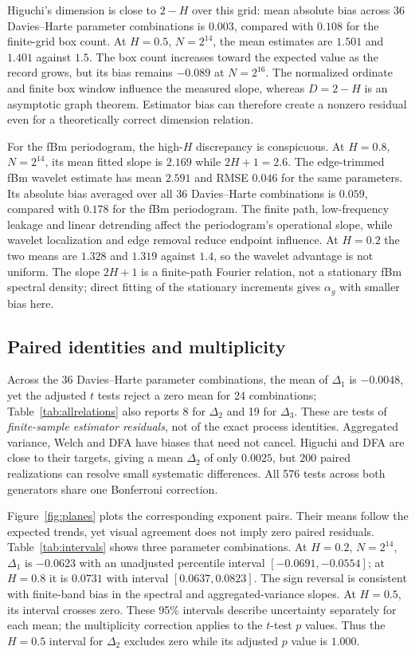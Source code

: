 \documentclass[12pt,twocolumn]{article}
\begin{document}
Higuchi's dimension is close to $2-H$ over this grid: mean absolute bias across 36 Davies--Harte parameter combinations is $0.003$, compared with $0.108$ for the finite-grid box count. At $H=0.5$, $N=2^{14}$, the mean estimates are $1.501$ and $1.401$ against $1.5$. The box count increases toward the expected value as the record grows, but its bias remains $-0.089$ at $N=2^{16}$. The normalized ordinate and finite box window influence the measured slope, whereas $D=2-H$ is an asymptotic graph theorem. Estimator bias can therefore create a nonzero residual even for a theoretically correct dimension relation.

For the fBm periodogram, the high-$H$ discrepancy is conspicuous. At $H=0.8$, $N=2^{14}$, its mean fitted slope is $2.169$ while $2H+1=2.6$. The edge-trimmed fBm wavelet estimate has mean $2.591$ and RMSE $0.046$ for the same parameters. Its absolute bias averaged over all 36 Davies--Harte combinations is $0.059$, compared with $0.178$ for the fBm periodogram. The finite path, low-frequency leakage and linear detrending affect the periodogram's operational slope, while wavelet localization and edge removal reduce endpoint influence. At $H=0.2$ the two means are $1.328$ and $1.319$ against $1.4$, so the wavelet advantage is not uniform. The slope $2H+1$ is a finite-path Fourier relation, not a stationary fBm spectral density; direct fitting of the stationary increments gives $\alpha_g$ with smaller bias here.

\subsection{Paired identities and multiplicity}

Across the 36 Davies--Harte parameter combinations, the mean of $\Delta_1$ is $-0.0048$, yet the adjusted $t$ tests reject a zero mean for 24 combinations; Table~\ref{tab:allrelations} also reports 8 for $\Delta_2$ and 19 for $\Delta_3$. These are tests of \emph{finite-sample estimator residuals}, not of the exact process identities. Aggregated variance, Welch and DFA have biases that need not cancel. Higuchi and DFA are close to their targets, giving a mean $\Delta_2$ of only $0.0025$, but 200 paired realizations can resolve small systematic differences. All 576 tests across both generators share one Bonferroni correction.

Figure~\ref{fig:planes} plots the corresponding exponent pairs. Their means follow the expected trends, yet visual agreement does not imply zero paired residuals. Table~\ref{tab:intervals} shows three parameter combinations. At $H=0.2$, $N=2^{14}$, $\Delta_1$ is $-0.0623$ with an unadjusted percentile interval $[-0.0691,-0.0554]$; at $H=0.8$ it is $0.0731$ with interval $[0.0637,0.0823]$. The sign reversal is consistent with finite-band bias in the spectral and aggregated-variance slopes. At $H=0.5$, its interval crosses zero. These 95\% intervals describe uncertainty separately for each mean; the multiplicity correction applies to the $t$-test $p$ values. Thus the $H=0.5$ interval for $\Delta_2$ excludes zero while its adjusted $p$ value is $1.000$.
\end{document}
